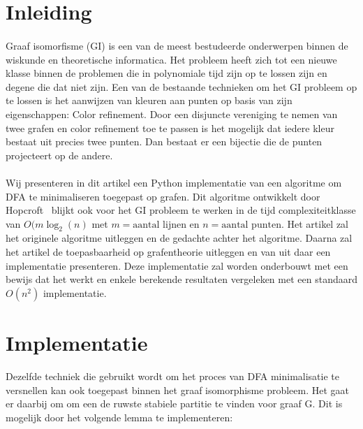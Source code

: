 \documentclass[twoside]{article}
\begin{document}
\begin{multicols}{2} %

\section{Inleiding}

\paragraph{}\noindent Graaf isomorfisme (GI) is een van de meest bestudeerde onderwerpen binnen de wiskunde en theoretische informatica. Het probleem heeft zich tot een nieuwe klasse binnen de problemen die in polynomiale tijd zijn op te lossen zijn en degene die dat niet zijn. Een van de bestaande technieken om het GI probleem op te lossen is het aanwijzen van kleuren aan punten op basis van zijn eigenschappen: Color refinement. Door een disjuncte vereniging te nemen van twee grafen en color refinement toe te passen is het mogelijk dat iedere kleur bestaat uit precies twee punten. Dan bestaat er een bijectie die de punten projecteert op de andere.
\paragraph{} \noindent Wij presenteren in dit artikel een Python implementatie van een algoritme om DFA te minimaliseren toegepast op grafen. Dit algoritme ontwikkelt door Hopcroft~\cite{MR0403320} blijkt ook voor het GI probleem te werken in de tijd complexiteitklasse van $O(m \log_{2} (n)$ met $m= \text{aantal lijnen}$ en $n = \text{aantal punten}$. Het artikel zal het originele algoritme uitleggen en de gedachte achter het algoritme. Daarna zal het artikel de toepasbaarheid op grafentheorie uitleggen en van uit daar een implementatie presenteren. Deze implementatie zal worden onderbouwt met een bewijs dat het werkt en enkele berekende resultaten vergeleken met een standaard $O(n^2)$ implementatie.



\section{Implementatie}

Dezelfde techniek die gebruikt wordt om het proces van DFA minimalisatie te versnellen kan ook toegepast binnen het graaf
isomorphisme probleem. Het gaat er daarbij om om een de ruwste stabiele partitie te vinden voor graaf G. Dit is mogelijk
door het volgende lemma te implementeren:


\end{multicols}
\end{document}
